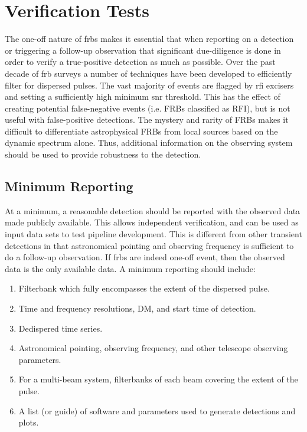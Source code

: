 \documentclass[a4paper,fleqn,usenatbib]{mnras}
\begin{document}
\section{Verification Tests}

The one-off nature of \glspl{frb} makes it essential that when reporting on a
detection or triggering a follow-up observation that significant due-diligence
is done in order to verify a true-positive detection as much as possible. Over the
past decade of \gls{frb} surveys a number of techniques have been developed to
efficiently filter for dispersed pulses. The vast majority of events are flagged
by \gls{rfi} excisers and setting a sufficiently high minimum \gls{snr}
threshold. This has the effect of creating potential false-negative events (i.e.
FRBs classified as RFI), but is not useful with false-positive detections. The
mystery and rarity of FRBs makes it difficult to differentiate astrophysical FRBs
from local sources based on the dynamic spectrum alone. Thus, additional
information on the observing system should be used to provide robustness to the
detection.


\subsection{Minimum Reporting}

At a minimum, a reasonable detection should be reported with the observed data
made publicly available.  This allows independent verification, and can be used
as input data sets to test pipeline development.  This is different from other
transient detections in that astronomical pointing and observing frequency is
sufficient to do a follow-up observation. If \glspl{frb} are indeed one-off
event, then the observed data is the only available data. A minimum reporting
should include:

\begin{enumerate}
    \item Filterbank which fully encompasses the extent of the dispersed pulse.
    \item Time and frequency resolutions, DM, and start time of detection.
    \item Dedispered time series.
    \item Astronomical pointing, observing frequency, and other telescope
    observing parameters.
    \item For a multi-beam system, filterbanks of each beam covering the extent
    of the pulse.
    \item A list (or guide) of software and parameters used to generate
    detections and plots.
\end{enumerate}
\end{document}
